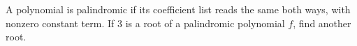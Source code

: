 A polynomial is palindromic if its coefficient list reads the same both ways, with nonzero constant term. If $3$ is a root of a palindromic polynomial $f$, find another root.
